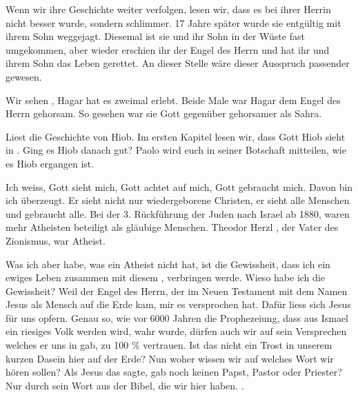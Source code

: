 Wenn wir ihre Geschichte weiter verfolgen, lesen wir, dass es bei ihrer Herrin nicht besser wurde, sondern schlimmer. 17 Jahre später wurde sie entgültig mit ihrem Sohn weggejagt. Diesemal ist sie und ihr Sohn in der Wüste fast umgekommen, aber wieder erschien ihr der Engel des Herrn und hat ihr und ihrem Sohn das Leben gerettet. An dieser Stelle wäre dieser Ausspruch passender gewesen.

Wir sehen , Hagar hat es zweimal erlebt. Beide Male war Hagar dem Engel des Herrn gehorsam. So gesehen war sie Gott gegenüber gehorsamer als Sahra.

Liest die Geschichte von Hiob. Im ersten Kapitel lesen wir, dass Gott Hiob sieht in . Ging es Hiob danach gut? Paolo wird euch in seiner Botschaft mitteilen, wie es Hiob ergangen ist.

Ich weiss, Gott sieht mich, Gott achtet auf mich, Gott gebraucht mich. Davon bin ich überzeugt. Er sieht nicht nur wiedergeborene Christen, er sieht alle Menschen und gebraucht alle. Bei der 3. Rückführung der Juden nach Israel ab 1880, waren mehr Atheisten beteiligt als gläubige Menschen. Theodor Herzl \zB, der Vater des Zionismus, war Atheist.

Was ich aber habe, was ein Atheist nicht hat, ist die Gewissheit, dass ich ein ewiges Leben zusammen mit diesem , verbringen werde. Wieso habe ich die Gewissheit? Weil der Engel des Herrn, der im Neuen Testament mit dem Namen Jesus als Mensch auf die Erde kam, mir es versprochen hat. Dafür liess sich Jesus für uns opfern. Genau so, wie vor 6000 Jahren die Prophezeiung, dass aus Ismael ein riesiges Volk werden wird, wahr wurde, dürfen auch wir auf sein Versprechen welches er uns in  gab, zu 100 \% vertrauen. Ist das nicht ein Trost in unserem kurzen Dasein hier auf der Erde? Nun woher wissen wir auf welches Wort wir hören sollen? Als Jesus das sagte, gab noch keinen Papst, Pastor oder Priester? Nur durch sein Wort aus der Bibel, die wir hier haben. .

